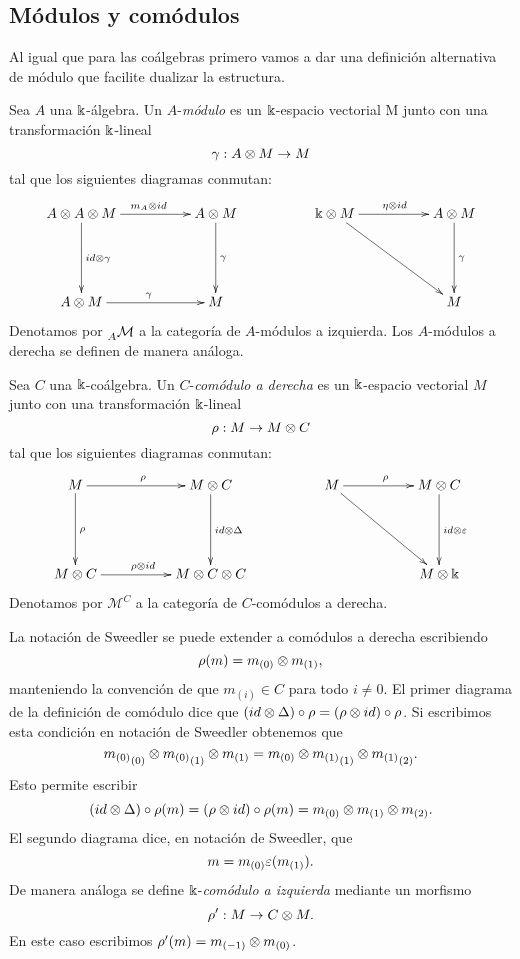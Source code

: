 \documentclass[a4paper,oneside,fleqn,11pt,../tesis.tex]{subfiles}
\begin{document}
\subsection{Módulos y comódulos}

Al igual que para las coálgebras primero vamos a dar una definición alternativa de módulo que facilite dualizar
la estructura.

\begin{definition}
	Sea $A$ una $\Bbbk$-álgebra. Un $A$-\emph{módulo} es un $\Bbbk$-espacio vectorial M junto con una transformación
	$\Bbbk$-lineal
	\[
		\gamma: A \otimes M \to M	
	\]
	tal que los siguientes diagramas conmutan:
	\begin{align*}
		\xymatrix@=5em{
			A \ox A \ox M \ar[r]^{m_A \ox id} \ar[d]^{id \ox \gamma} & A \ox M \ar[d]^{\gamma}
				& \field \ox M \ar[rd] \ar[r]^{\eta \ox id} & A \ox M \ar[d]^{\gamma}\\
			A \ox M \ar[r]^{\gamma} & M
				&& M
		}
	\end{align*}
	Denotamos por $\prescript{}{A}{\mathcal{M}}$ a la categoría de $A$-módulos a izquierda. Los $A$-módulos a derecha
	se definen de manera análoga.
\end{definition}

\begin{definition}
	Sea $C$ una $\Bbbk$-coálgebra. Un $C$-\emph{comódulo a derecha} es un $\Bbbk$-espacio vectorial $M$
	junto con una transformación $\Bbbk$-lineal
	\[
		\rho: M \to M \otimes C	
	\]	
	tal que los siguientes diagramas conmutan:
	\begin{align*}
		\xymatrix@=5em{
			M \ar[r]^{\rho} \ar[d]^{\rho} & M \ox C \ar[d]^{id \ox \Delta}
				& M \ar[rd] \ar[r]^{\rho} & M \ox C \ar[d]^{id \ox \veps}\\
			M \ox C \ar[r]^{\rho \ox id} & M \ox C \ox C
				&& M \ox \field
		}
	\end{align*}
	Denotamos por $\mathcal{M}^{C}$ a la categoría de $C$-comódulos a derecha.
\end{definition}

La notación de Sweedler se puede extender a comódulos a derecha escribiendo
\[
	\rho(m) = m_{(0)} \otimes m_{(1)},
\]
manteniendo la convención de que $m_{(i)} \in C$ para todo $i \neq 0$. El primer diagrama
de la definición de comódulo dice que $(id \otimes \Delta) \circ \rho = (\rho \otimes id) \circ \rho$.
Si escribimos esta condición en notación de Sweedler obtenemos que
\[
	{m_{(0)}}_{(0)} \otimes {m_{(0)}}_{(1)} \otimes m_{(1)} = m_{(0)} \otimes {m_{(1)}}_{(1)} \otimes {m_{(1)}}_{(2)}.
\]
Esto permite escribir
\[
	(id \otimes \Delta) \circ \rho(m) = (\rho \otimes id) \circ \rho(m) = m_{(0)} \otimes m_{(1)} \otimes m_{(2)}.
\]
El segundo diagrama dice, en notación de Sweedler, que
\[
	m = m_{(0)} \varepsilon(m_{(1)}).
\]
De manera análoga se define $\Bbbk$-\emph{comódulo a izquierda} mediante un morfismo
\[
	\rho': M \to C \otimes M.
\]
En este caso escribimos $\rho'(m) = m_{(-1)} \otimes m_{(0)}$.
\end{document}
